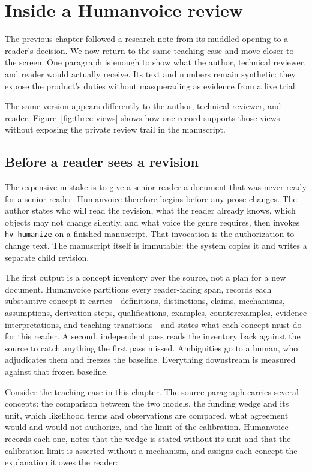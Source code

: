 \chapter{Inside a Humanvoice review}
\label{ch:product}

The previous chapter followed a research note from its muddled opening to a
reader's decision. We now return to the same teaching case and move closer to
the screen. One paragraph is enough to show what the author, technical reviewer,
and reader would actually receive. Its text and numbers remain synthetic: they
expose the product's duties without masquerading as evidence from a live trial.

The same version appears differently to the author, technical reviewer, and
reader. Figure~\ref{fig:three-views} shows how one record supports those views
without exposing the private review trail in the manuscript.

\hvFigureThreeViews

\section{Before a reader sees a revision}

The expensive mistake is to give a senior reader a document that was never
ready for a senior reader. Humanvoice therefore begins before any prose changes.
The author states who will read the revision, what the reader already knows,
which objects may not change silently, and what voice the genre requires, then
invokes \texttt{hv humanize} on a finished manuscript. That invocation is the
authorization to change text. The manuscript itself is immutable: the system
copies it and writes a separate child revision.

The first output is a concept inventory over the source, not a plan for a new
document. Humanvoice partitions every reader-facing span, records each
substantive concept it carries---definitions, distinctions, claims, mechanisms,
assumptions, derivation steps, qualifications, examples, counterexamples,
evidence interpretations, and teaching transitions---and states what each
concept must do for this reader. A second, independent pass reads the inventory
back against the source to catch anything the first pass missed. Ambiguities go
to a human, who adjudicates them and freezes the baseline. Everything downstream
is measured against that frozen baseline.

Consider the teaching case in this chapter. The source paragraph carries several
concepts: the comparison between the two models, the funding wedge and its unit,
which likelihood terms and observations are compared, what agreement would and
would not authorize, and the limit of the calibration. Humanvoice records each
one, notes that the wedge is stated without its unit and that the calibration
limit is asserted without a mechanism, and assigns each concept the explanation
it owes the reader:

